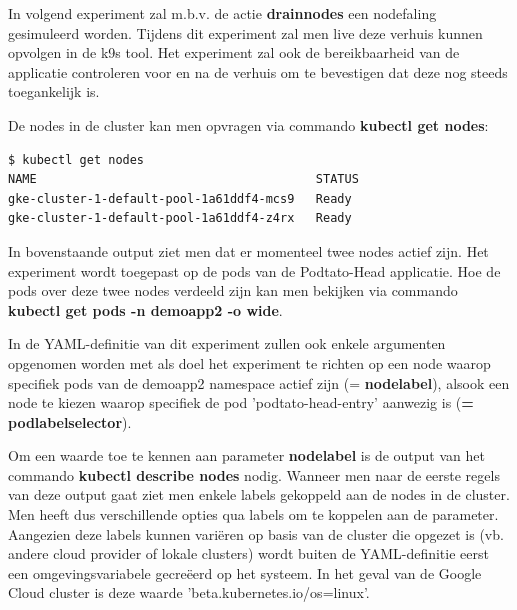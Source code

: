 In volgend experiment zal m.b.v. de actie {\bf drain\textunderscore nodes} een nodefaling gesimuleerd worden. Tijdens dit experiment zal men live deze verhuis kunnen opvolgen in de k9s tool. Het experiment zal ook de bereikbaarheid van de applicatie controleren voor en na de verhuis om te bevestigen dat deze nog steeds toegankelijk is. \autocite{ChaosToolkit2022e} 

De nodes in de cluster kan men opvragen via commando {\bf kubectl get nodes}: 
\begin{lstlisting}[language=bash]
$ kubectl get nodes
NAME                                       STATUS
gke-cluster-1-default-pool-1a61ddf4-mcs9   Ready
gke-cluster-1-default-pool-1a61ddf4-z4rx   Ready

\end{lstlisting}

In bovenstaande output ziet men dat er momenteel twee nodes actief zijn. Het experiment wordt toegepast op de pods van de Podtato-Head applicatie. Hoe de pods over deze twee nodes verdeeld zijn kan men bekijken via commando {\bf kubectl get pods -n demoapp2 -o wide}.
 
In de YAML-definitie van dit experiment zullen ook enkele argumenten opgenomen worden met als doel het experiment te richten op een node waarop specifiek pods van de demoapp2 namespace actief zijn (= {\bf node\textunderscore label}), alsook een node te kiezen waarop specifiek de pod 'podtato-head-entry' aanwezig is ({\bf = pod\textunderscore label\textunderscore selector}).

Om een waarde toe te kennen aan parameter {\bf node\textunderscore label} is de output van het commando {\bf kubectl describe nodes} nodig. Wanneer men naar de eerste regels van deze output gaat ziet men enkele labels gekoppeld aan de nodes in de cluster. Men heeft dus verschillende opties qua labels om te koppelen aan de parameter. Aangezien deze labels kunnen variëren op basis van de cluster die opgezet is (vb. andere cloud provider of lokale clusters) wordt buiten de YAML-definitie eerst een omgevingsvariabele gecreëerd op het systeem.
\newline In het geval van de Google Cloud cluster is deze waarde 'beta.kubernetes.io/os=linux'. 

